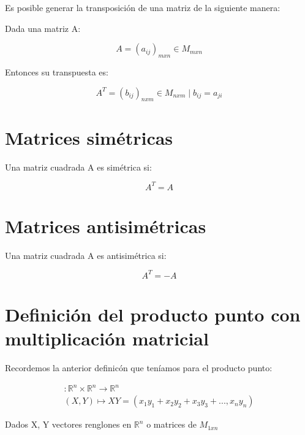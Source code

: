 \documentclass{article}
\makeatletter
\newcommand*{\bigcdot}{}%
\DeclareRobustCommand*{\bigcdot}{%
  \mathbin{\mathpalette\bigcdot@{}}%
}
\newcommand*{\bigcdot@scalefactor}{.5}
\newcommand*{\bigcdot@widthfactor}{1.15}
\newcommand*{\bigcdot@}[2]{%
  \sbox0{$#1\vcenter{}$}%
  \sbox2{$#1\cdot\m@th$}%
  \hbox to \bigcdot@widthfactor\wd2{%
    \hfil
    \raise\ht0\hbox{%
      \scalebox{\bigcdot@scalefactor}{%
        \lower\ht0\hbox{$#1\bullet\m@th$}%
      }%
    }%
    \hfil
  }%
}
\makeatother
\begin{document}
    Es posible generar la transposición de una matriz de la siguiente manera:
    \vspace{5px}

    Dada una matriz A:

    \begin{equation}
      A = (a_{ij})_{mxn} \in M_{mxn}
    \end{equation}

    \vspace{5px}
    
    Entonces su transpuesta es: 

    \begin{equation}
      A^{T}=  (b_{ij})_{nxm} \in M_{nxm} \mid b_{ij} = a_{ji} 
    \end{equation}

\section{Matrices simétricas}

    Una matriz cuadrada A es simétrica si:

    \begin{equation*}
      A^{T}=A
    \end{equation*}

\section{Matrices antisimétricas}

    Una matriz cuadrada A es antisimétrica si:

    \begin{equation*}
      A^{T}=-A
    \end{equation*}
    
\section{Definición del producto punto con multiplicación matricial}


  Recordemos la anterior definicón que teníamos para el producto punto:

  \begin{gather*}
    \bigcdot : \mathbb{R}^{n} \times \mathbb{R}^{n} \longrightarrow \mathbb{R}^{n} \\
    (X, Y) \longmapsto X \bigcdot Y =  ( x_{1}y_{1}+x_{2}y_{2}+x_{3}y_{3}+...,x_{n}y_{n} ) 
  \end{gather*}

  Dados X, Y vectores renglones en $\mathbb{R}^{n}$ o matrices de $M_{1xn}$  
\end{document}
